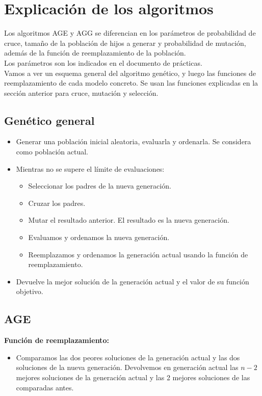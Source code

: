 \section{Explicación de los algoritmos}

Los algoritmos AGE y AGG se diferencian en los parámetros de probabilidad de cruce, tamaño de la población de hijos a generar y probabilidad de mutación, además de la función de reemplazamiento de la población.\\

Los parámetros son los indicados en el documento de prácticas.\\

Vamos a ver un esquema general del algoritmo genético, y luego las funciones de reemplazamiento de cada modelo concreto. Se usan las funciones explicadas en la sección anterior para cruce, mutación y selección.\\

\subsection{Genético general}

\begin{itemize}
\item Generar una población inicial aleatoria, evaluarla y ordenarla. Se considera como población actual.
\item Mientras no se supere el límite de evaluaciones:
\begin{itemize}
\item Seleccionar los padres de la nueva generación.
\item Cruzar los padres.
\item Mutar el resultado anterior. El resultado es la nueva generación.
\item Evaluamos y ordenamos la nueva generación.
\item Reemplazamos y ordenamos la generación actual usando la función de reemplazamiento.
\end{itemize} 
\item Devuelve la mejor solución de la generación actual y el valor de su función objetivo.
\end{itemize} 
\newpage
\subsection{AGE}
\textbf{Función de reemplazamiento:}
\begin{itemize}
\item Comparamos las dos peores soluciones de la generación actual y las dos soluciones de la nueva generación. Devolvemos en generación actual las $n-2$ mejores soluciones de la generación actual y las 2 mejores soluciones de las comparadas antes.
\end{itemize}

